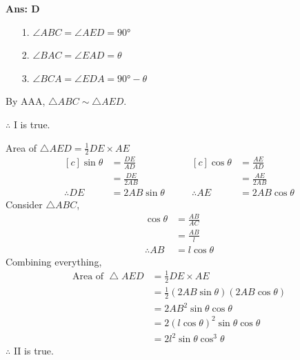 \documentclass[varwidth=70mm]{standalone}
\begin{document}
\begin{answer}
\hrulefill\par
\textbf{Ans: D}

\begin{itemize}
	\item[1.] $\angle ABC = \angle AED = \ang{90}$
	\item[2.] $\angle BAC = \angle EAD = \theta$
	\item[3.] $\angle BCA = \angle EDA = \ang{90}-\theta$
\end{itemize}
By AAA, $\bigtriangleup ABC \sim \bigtriangleup AED$.\par
$\therefore$ I is true.\par\medskip

Area of $\bigtriangleup AED = \frac{1}{2}DE\times AE$
\begin{equation*}
\begin{aligned}[c]
\sin\theta &= \frac{DE}{AD} \\
		   &= \frac{DE}{2AB} \\
\therefore DE &= 2AB\sin\theta
\end{aligned}
\qquad
\begin{aligned}[c]
\cos\theta &= \frac{AE}{AD} \\
		   &= \frac{AE}{2AB} \\
\therefore AE &= 2AB\cos\theta
\end{aligned}
\end{equation*}
Consider  $\bigtriangleup ABC$,
\begin{equation*}
\begin{aligned}
\cos\theta &= \frac{AB}{AC} \\
		   &= \frac{AB}{l} \\
\therefore AB &= l\cos\theta		   
\end{aligned}
\end{equation*}
Combining everything,
\begin{equation*}
\begin{aligned}
\text{Area of }\bigtriangleup AED &= \frac{1}{2}DE\times AE \\
								  &= \frac{1}{2}(2AB\sin\theta)(2AB\cos\theta) \\
								  &= 2AB^2\sin\theta\cos\theta \\
								  &=  2(l\cos\theta)^2\sin\theta\cos\theta \\
								  &= 2l^2\sin\theta\cos^3\theta
\end{aligned}
\end{equation*}
$\therefore$ II is true.\par\medskip


\end{answer}
\end{document}
